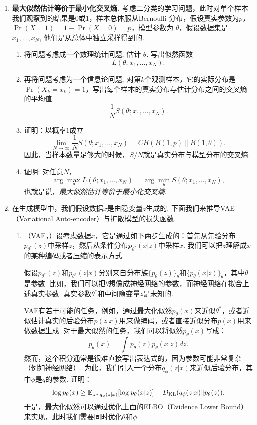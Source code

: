 \begin{enumerate}[wide, labelindent=0pt]
    \item \label{exercise:cross-entropy-maximum-likelihood} \textbf{最大似然估计等价于最小化交叉熵. }考虑二分类的学习问题，此时对单个样本我们观察到的结果是$0$或$1$，样本总体服从Bernoulli 分布，假设真实参数为$p$， $\Pr(X=1)=1-\Pr(X=0)=p$，模型参数为 $\theta$，假设数据集是 $x_1,\dots,x_N$, 他们是从总体中独立采样得到的.
    \begin{enumerate}
        \item 将问题考虑成一个数理统计问题, 估计 $\theta$. 写出似然函数 
        \[L(\theta ; x_1, \ldots, x_N).\]
        \item 再将问题考虑为一个信息论问题, 对第$k$个观测样本，它的实际分布是$\Pr(X_k=x_k)=1$，写出每个样本的真实分布与估计分布之间的交叉熵的平均值
        \[\frac{1}{N}S(\theta ; x_1, \ldots, x_N).\]
        \item 证明：以概率$1$成立
        \[\lim_{N\to\infty}\frac{1}{N}S(\theta ; x_1, \ldots, x_N)=CH(B(1,p)\| B(1,\theta)).\]
        因此，当样本数量足够大的时候，$S/N$就是真实分布与模型分布的交叉熵.
        \item 证明: 对任意$N$，
        \[\arg\max_\theta L(\theta ; x_1, \ldots, x_N)=\arg\min _\theta S(\theta ; x_1, \ldots, x_N),\]
        也就是说，\textit{最大似然估计等价于最小化交叉熵}.
    \end{enumerate}

    \item \label{exercise:diffusion-model-loss}
    在生成模型中，我们假设数据$x$是由隐变量$z$生成的. 下面我们来推导VAE（Variational Auto-encoder）与扩散模型的损失函数.
    \begin{enumerate}
        \item （VAE，\cite{kingmaAutoEncodingVariationalBayes2022,kingmaSemisupervisedLearningDeep2014}）设考虑数据$x$，它是通过如下两步生成的：首先从先验分布$p_{\theta^*}(z)$中采样$z$，然后从条件分布$p_{\theta^*}(x|z)$中采样$x$. 我们可以把$z$理解成$x$的某种编码或者压缩的表示方式. 
        
        假设$p_{\theta^*}(z)$和$p_{\theta^*}(z|x)$分别来自分布族$\{p_{\theta}(z)\}_\theta$和$\{p_\theta(x|z)\}_\theta$，其中$\theta$是参数. 比如，我们可以把$\theta$想像成神经网络的参数，而神经网络在拟合上述真实参数. 真实参数$\theta^*$和中间隐变量$z$是未知的. 
        
        VAE有若干可能的任务，例如，通过最大化似然$p_{\theta}(x)$来近似$\theta^*$，或者近似估计真实的后验分布$p(z|x)$用来做编码，或者直接近似分布$p(x)$用来做数据生成. 对于最大似然的任务，我们可以将似然$p_{\theta}(x)$写成：
        \[
            p_{\theta}(x) = \int p_\theta(z)p_\theta(x|z)dz.
        \]
        然而，这个积分通常是很难直接写出表达式的，因为参数可能非常复杂（例如神经网络）. 为此，我们引入一个分布$q_{\phi}(z|x)$来近似后验分布，其中$\phi$是$q$的参数. 证明：
        \[
            \log p_{\theta}(x) \geq \mathbb{E}_{z\sim q_{\phi}(z|x)}[\log p_{\theta}(x|z)] - D_{\mathrm{KL}}(q_{\phi}(z|x)\Vert p_{\theta}(z)).
        \]
        于是，最大化似然可以通过优化上面的ELBO（Evidence Lower Bound）来实现，此时我们需要同时优化$\theta$和$\phi$.


\end{enumerate}
\end{enumerate}
